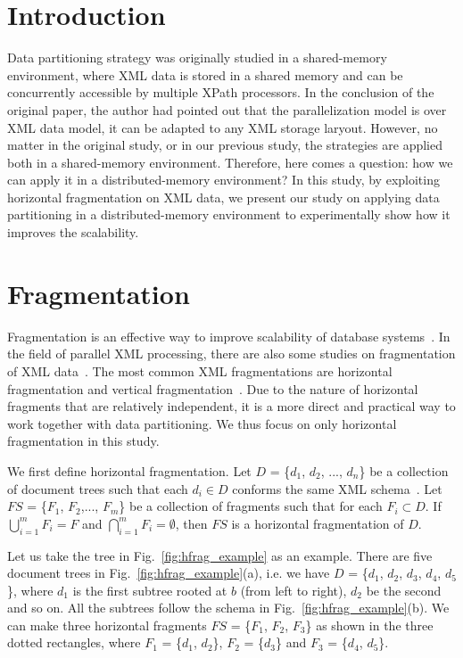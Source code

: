 
\section{Introduction}

Data partitioning strategy was originally studied in a shared-memory
environment, where XML data is stored in a shared memory and can be concurrently
accessible by multiple XPath processors. In the conclusion of the original
paper,  the author had pointed out that the parallelization model is over XML
data model, it  can be adapted to any XML storage laryout. However, no matter in
the original study,  or in our previous study, the strategies are applied both
in a shared-memory environment. Therefore, here comes a question:  how we can
apply it in a distributed-memory environment? In this study, by exploiting
horizontal fragmentation on XML data, we present our study on applying data
partitioning in a distributed-memory environment to experimentally show how it
improves the scalability.

\section{Fragmentation}

Fragmentation is an effective way to improve scalability of database
systems~\cite{navathe1995mixed, hauglid2010dyfram, khan2010new}.  In the field
of parallel XML processing, there are also some studies on  fragmentation of XML
data~\cite{kling11:dist_xml, KlOD10}.  The most common XML fragmentations are
horizontal fragmentation and vertical fragmentation~\cite{kling11:dist_xml}. Due
to the nature of horizontal fragments that are  relatively independent, it is a
more direct and practical way to work together with data partitioning. We thus
focus on only horizontal fragmentation in this study.

We first define horizontal fragmentation.  Let $D$ = \{$d_1$, $d_2$, ...,
$d_n$\} be a collection of document trees such that each $d_i \in D$ conforms
the same XML schema~\cite{xmlschema}.  Let $\mathit{FS}$ = \{$F_1$, $F_2$,...,
$F_m$\}  be a collection of fragments such that for each $F_i \subset D$. If
$\bigcup\limits_{i=1}^{m} F_{i} = F$ and $\bigcap\limits_{i=1}^{m} F_{i} =
\emptyset$, then $\mathit{FS}$ is a horizontal fragmentation of $D$.

Let us take the tree in Fig.~\ref{fig:hfrag_example} as an example. There are
five document trees in Fig.~\ref{fig:hfrag_example}(a), i.e. we have $D$ =
\{$d_1$, $d_2$, $d_3$, $d_4$, $d_5$\}, where $d_1$ is  the first subtree rooted
at $b$ (from left to right), $d_2$ be the second and so on. All the subtrees
follow the schema in Fig.~\ref{fig:hfrag_example}(b). We can make three
horizontal fragments $FS$ = \{$F_1$, $F_2$, $F_3$\} as shown in the three dotted
rectangles, where $F_1$ = \{$d_1$, $d_2$\}, $F_2$ = \{$d_3$\} and  $F_3$ =
\{$d_4$, $d_5$\}.


